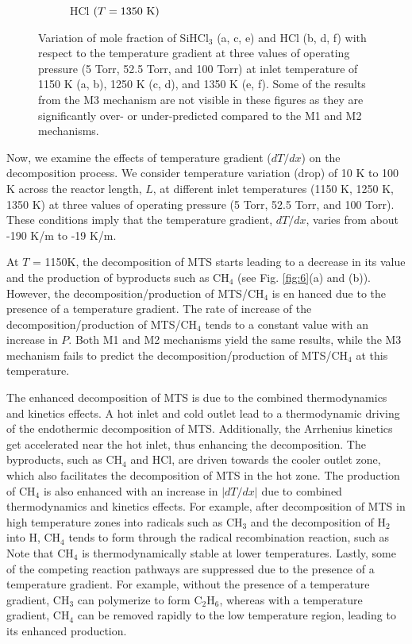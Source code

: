 \documentclass[final, letterpaper, square, comma, numbers, sort&compress]{elsarticle}
\begin{document}
\begin{figure}
\begin{subfigure}{0.49\textwidth}
        \caption{HCl $(T=1350\rm\ K)$}
    \end{subfigure}
    \caption{Variation of mole fraction of SiHCl$_3$ (a, c, e) and HCl (b, d, f) with respect to the temperature gradient at three values of operating pressure (5 Torr, 52.5 Torr, and 100 Torr) at inlet temperature of 1150 K (a, b), 1250 K (c, d), and 1350 K (e, f). Some of the results from the M3 mechanism are not visible in these figures as they are significantly over- or under-predicted compared to the M1 and M2 mechanisms.}
    \label{fig:9}
\end{figure}
Now, we examine the effects of temperature gradient ($dT/dx$) on the decomposition process. We consider temperature variation (drop) of 10 K to 100 K across the reactor length, $L$, at different inlet temperatures (1150 K, 1250 K, 1350 K) at three values of operating pressure (5 Torr, 52.5 Torr, and 100 Torr). These conditions imply that the temperature gradient, $dT/dx$, varies from about -190 K/m to -19 K/m.

At $T$ = 1150K, the decomposition of MTS starts leading to a decrease in its value and the production of byproducts such as CH$_4$ (see Fig. \ref{fig:6}(a) and (b)). However, the decomposition/production of MTS/CH$_4$ is en hanced due to the presence of a temperature gradient. The rate of increase of the decomposition/production of MTS/CH$_4$ tends to a constant value with an increase in $P$. Both M1 and M2 mechanisms yield the same results, while the M3 mechanism fails to predict the decomposition/production of MTS/CH$_4$ at this temperature.

The enhanced decomposition of MTS is due to the combined thermodynamics and kinetics effects. A hot inlet and cold outlet lead to a thermodynamic driving of the endothermic decomposition of MTS. Additionally, the Arrhenius kinetics get accelerated near the hot inlet, thus enhancing the decomposition. The byproducts, such as CH$_4$ and HCl, are driven towards the cooler outlet zone, which also facilitates the decomposition of MTS in the hot zone. The production of CH$_4$ is also enhanced with an increase in $|dT/dx|$ due to combined thermodynamics and kinetics effects. For example, after decomposition of MTS in high temperature zones into radicals such as CH$_3$ and the decomposition of H$_2$ into H, CH$_4$ tends to form through the radical recombination reaction, such as
Note that CH$_4$ is thermodynamically stable at lower temperatures. Lastly, some of the competing reaction pathways are suppressed due to the presence of a temperature gradient. For example, without the presence of a temperature gradient, CH$_3$ can polymerize to form C$_2$H$_6$, whereas with a temperature gradient, CH$_4$ can be removed rapidly to the low temperature region, leading to its enhanced production.
\end{document}
